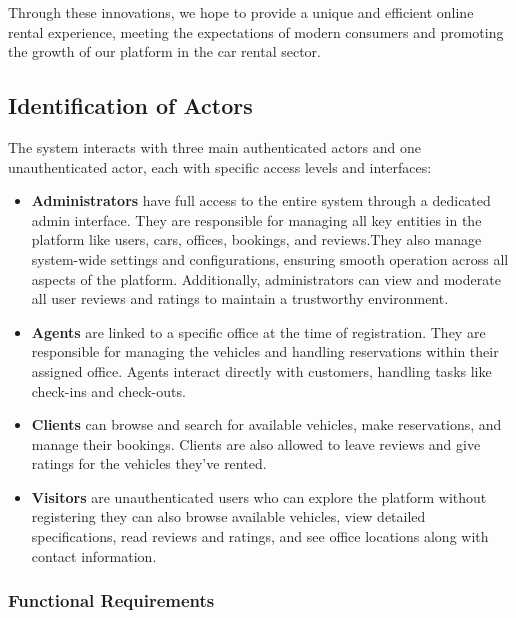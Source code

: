 Through these innovations, we hope to provide a unique and efficient online rental experience, meeting the expectations of modern consumers and promoting the growth of our platform in the car rental sector.

\subsection{Identification of Actors}
The system interacts with three main authenticated actors and one unauthenticated actor, each with specific access levels and interfaces:

\begin{itemize}
    \item \textbf{Administrators} have full access to the entire system through a dedicated admin interface. They are responsible for managing all key entities in the platform like users, cars, offices, bookings, and reviews.They also manage system-wide settings and configurations, ensuring smooth operation across all aspects of the platform. Additionally, administrators can view and moderate all user reviews and ratings to maintain a trustworthy environment.
    
    \item \textbf{Agents} are linked to a specific office at the time of registration. They are responsible for managing the vehicles and handling reservations within their assigned office. Agents interact directly with customers, handling tasks like check-ins and check-outs.
    
    \item \textbf{Clients} can browse and search for available vehicles, make reservations, and manage their bookings. Clients are also allowed to leave reviews and give ratings for the vehicles they've rented.
    
    \item \textbf{Visitors} are unauthenticated users who can explore the platform without registering they can also  browse available vehicles, view detailed specifications, read reviews and ratings, and see office locations along with contact information.
\end{itemize}
\newpage
\subsubsection{Functional Requirements}

